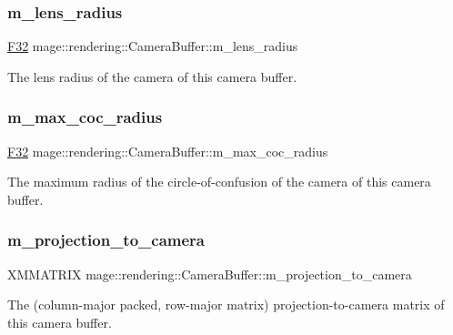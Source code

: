 \subsubsection{\texorpdfstring{m\+\_\+lens\+\_\+radius}{m\_lens\_radius}}
{\footnotesize\ttfamily \hyperlink{namespacemage_aa97e833b45f06d60a0a9c4fc22ae02c0}{F32} mage\+::rendering\+::\+Camera\+Buffer\+::m\+\_\+lens\+\_\+radius}

The lens radius of the camera of this camera buffer. \hypertarget{structmage_1_1rendering_1_1_camera_buffer_a3273510e0a7bbdd9481fe67f9e223f59}{}\label{structmage_1_1rendering_1_1_camera_buffer_a3273510e0a7bbdd9481fe67f9e223f59} 
\subsubsection{\texorpdfstring{m\+\_\+max\+\_\+coc\+\_\+radius}{m\_max\_coc\_radius}}
{\footnotesize\ttfamily \hyperlink{namespacemage_aa97e833b45f06d60a0a9c4fc22ae02c0}{F32} mage\+::rendering\+::\+Camera\+Buffer\+::m\+\_\+max\+\_\+coc\+\_\+radius}

The maximum radius of the circle-\/of-\/confusion of the camera of this camera buffer. \hypertarget{structmage_1_1rendering_1_1_camera_buffer_a9cb9e0e4005d55b72668bbdcf4a27218}{}\label{structmage_1_1rendering_1_1_camera_buffer_a9cb9e0e4005d55b72668bbdcf4a27218} 
\subsubsection{\texorpdfstring{m\+\_\+projection\+\_\+to\+\_\+camera}{m\_projection\_to\_camera}}
{\footnotesize\ttfamily X\+M\+M\+A\+T\+R\+IX mage\+::rendering\+::\+Camera\+Buffer\+::m\+\_\+projection\+\_\+to\+\_\+camera}

The (column-\/major packed, row-\/major matrix) projection-\/to-\/camera matrix of this camera buffer. \hypertarget{structmage_1_1rendering_1_1_camera_buffer_abfb4dbb9a228b6a7412b09b179fd157d}{}\label{structmage_1_1rendering_1_1_camera_buffer_abfb4dbb9a228b6a7412b09b179fd157d} 
